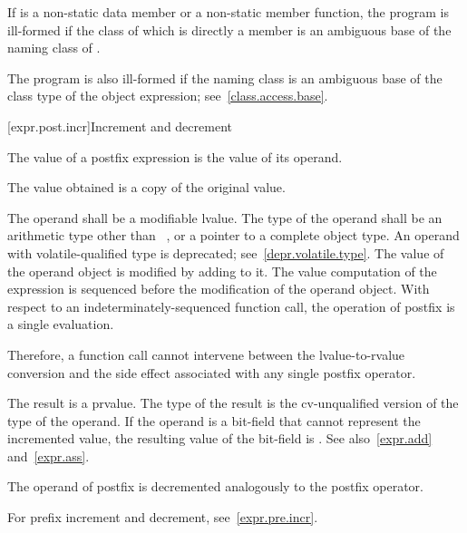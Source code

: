 \pnum
If  is a non-static data member or a non-static member
function, the program is ill-formed if the class of which  is
directly a member is an ambiguous base of
the naming class of .
\begin{note}
The program is also ill-formed if the naming class is an ambiguous base of the class type
of the object expression; see~\ref{class.access.base}.
\end{note}

[expr.post.incr]{Increment and decrement}

\pnum
{}%
%
%
%
The value of a postfix \tcode{++} expression is the value of its
operand.
\begin{note}
The value obtained is a copy of the original value.
\end{note}
The operand shall be a modifiable lvalue. The type of the operand shall
be an arithmetic type other than \cv{}~,
or a pointer to a complete object type.
An operand with volatile-qualified type is deprecated;
see~\ref{depr.volatile.type}.
The value of the operand object is modified
by adding  to it.
The
%
value computation of the \tcode{++} expression is sequenced before the
modification of the operand object. With respect to an
indeterminately-sequenced function call, the operation of postfix
\tcode{++} is
a single evaluation.
\begin{note}
Therefore, a function call cannot intervene between the
lvalue-to-rvalue conversion and the side effect associated with any
single postfix \tcode{++} operator.
\end{note}
The result is a prvalue. The type of the result is the cv-unqualified
version of the type of the operand.
If the operand is a bit-field that cannot represent the incremented value, the
resulting value of the bit-field is
.
See also~\ref{expr.add}
and~\ref{expr.ass}.

\pnum
{}%
%
%
%
The operand of postfix \tcode{--} is decremented analogously to the
postfix \tcode{++} operator.
\begin{note}
For prefix increment and decrement, see~\ref{expr.pre.incr}.
\end{note}

